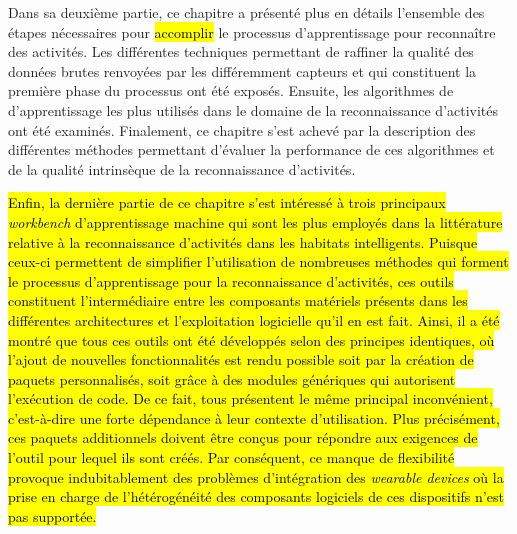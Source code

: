 Dans sa deuxième partie, ce chapitre a présenté plus en détails l'ensemble des étapes nécessaires pour \hl{accomplir} le processus d'apprentissage pour reconnaître des activités. Les différentes techniques permettant de raffiner la qualité des données brutes renvoyées par les différemment capteurs et qui constituent la première phase du processus ont été exposés. Ensuite, les algorithmes de d'apprentissage les plus utilisés dans le domaine de la reconnaissance d'activités ont été examinés. Finalement, ce chapitre s'est achevé par la description des différentes méthodes permettant d'évaluer la performance de ces algorithmes et de la qualité intrinsèque de la reconnaissance d'activités.

\hl{Enfin, la dernière partie de ce chapitre s'est intéressé à trois principaux \textit{workbench} d'apprentissage machine qui sont les plus employés dans la littérature relative à la reconnaissance d'activités dans les habitats intelligents. Puisque ceux-ci permettent de simplifier l'utilisation de nombreuses méthodes qui forment le processus d'apprentissage pour la reconnaissance d'activités, ces outils constituent l'intermédiaire entre les composants matériels présents dans les différentes architectures et l'exploitation logicielle qu'il en est fait. Ainsi, il a été montré que tous ces outils ont été développés selon des principes identiques, où l'ajout de nouvelles fonctionnalités est rendu possible soit par la création de paquets personnalisés, soit grâce à des modules génériques qui autorisent l'exécution de code. De ce fait, tous présentent le même principal inconvénient, c'est-à-dire une forte dépendance à leur contexte d'utilisation. Plus précisément, ces paquets additionnels doivent être conçus pour répondre aux exigences de l'outil pour lequel ils sont créés. Par conséquent, ce manque de flexibilité provoque indubitablement des problèmes d'intégration des \textit{wearable devices} où la prise en charge de l'hétérogénéité des composants logiciels de ces dispositifs n'est pas supportée.}
